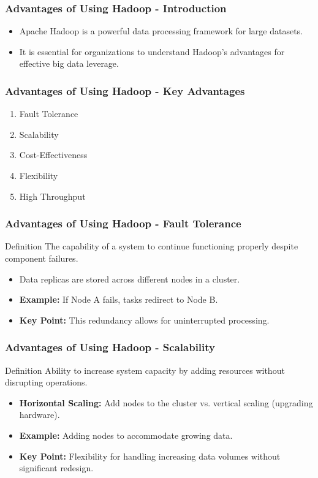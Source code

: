 \documentclass[aspectratio=169]{beamer}
\begin{document}
\begin{frame}[fragile]
    \frametitle{Advantages of Using Hadoop - Introduction}
    \begin{itemize}
        \item Apache Hadoop is a powerful data processing framework for large datasets.
        \item It is essential for organizations to understand Hadoop's advantages for effective big data leverage.
    \end{itemize}
\end{frame}

\begin{frame}[fragile]
    \frametitle{Advantages of Using Hadoop - Key Advantages}
    \begin{enumerate}
        \item Fault Tolerance
        \item Scalability
        \item Cost-Effectiveness
        \item Flexibility
        \item High Throughput
    \end{enumerate}
\end{frame}

\begin{frame}[fragile]
    \frametitle{Advantages of Using Hadoop - Fault Tolerance}
    \begin{block}{Definition}
        The capability of a system to continue functioning properly despite component failures.
    \end{block}
    \begin{itemize}
        \item Data replicas are stored across different nodes in a cluster.
        \item \textbf{Example:} If Node A fails, tasks redirect to Node B.
        \item \textbf{Key Point:} This redundancy allows for uninterrupted processing.
    \end{itemize}
\end{frame}

\begin{frame}[fragile]
    \frametitle{Advantages of Using Hadoop - Scalability}
    \begin{block}{Definition}
        Ability to increase system capacity by adding resources without disrupting operations.
    \end{block}
    \begin{itemize}
        \item \textbf{Horizontal Scaling:} Add nodes to the cluster vs. vertical scaling (upgrading hardware).
        \item \textbf{Example:} Adding nodes to accommodate growing data.
        \item \textbf{Key Point:} Flexibility for handling increasing data volumes without significant redesign.
    \end{itemize}
\end{frame}
\end{document}
